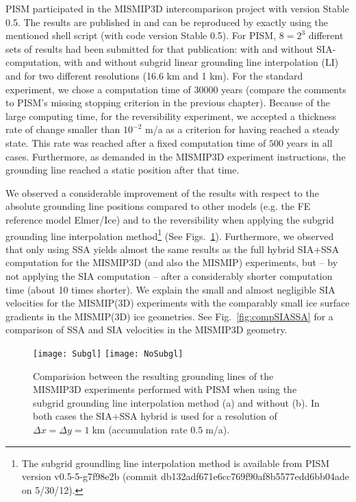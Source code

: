 PISM participated in the MISMIP3D intercomparison project with version Stable 0.5. The results are published in \cite{MISMIP3D2012} and can be reproduced by exactly using the mentioned shell script (with code version Stable 0.5). For PISM, $8=2^3$ different sets of results had been submitted for that publication: with and without SIA-computation, with and without subgrid linear grounding line interpolation (LI) and for two different resolutions (16.6 km and 1 km). For the standard experiment, we chose a computation time of $30000$ years (compare the comments to PISM's missing stopping criterion in the previous chapter). Because of the large computing time, for the reversibility experiment, we accepted a thickness rate of change smaller than $10^{−2}$ m/a as a criterion for having reached a steady state. This rate was reached after a fixed computation time of $500$ years in all cases. Furthermore, as demanded in the MISMIP3D experiment instructions, the grounding line reached a static position after that time.

We observed a considerable improvement of the results with respect to the absolute grounding line positions compared to other models (e.g. the FE reference model Elmer/Ice) and to the reversibility when applying the subgrid grounding line interpolation method\footnote{The subgrid groundling line interpolation method is available from PISM version v0.5-5-g7f98e2b (commit db132adf671e6cc769f90af8b5577edd6bb04ade on 5/30/12).} (See Figs.~\ref{fig:Subgl}). Furthermore, we observed that only using SSA yields almost the same results as the full hybrid SIA+SSA computation for the MISMIP3D (and also the MISMIP) experiments, but -- by not applying the SIA computation -- after a considerably shorter computation time (about 10 times shorter). We explain the small and almost negligible SIA velocities for the MISMIP(3D) experiments with the comparably small ice surface gradients in the MISMIP(3D) ice geometries. See Fig.~\ref{fig:compSIASSA} for a comparison of SSA and SIA velocities in the MISMIP3D geometry.



\begin{figure}[ht]
\centering
\texttt{[image: Subgl]}
\texttt{[image: NoSubgl]}
\caption{Comparision between the resulting grounding lines of the MISMIP3D experiments performed with PISM when using the subgrid grounding line interpolation method (a) and without (b). In both cases the SIA+SSA hybrid is used for a resolution of $\Delta x = \Delta y = 1\;$km (accumulation rate $0.5\;$m/a).}
\label{fig:Subgl}
\end{figure}

